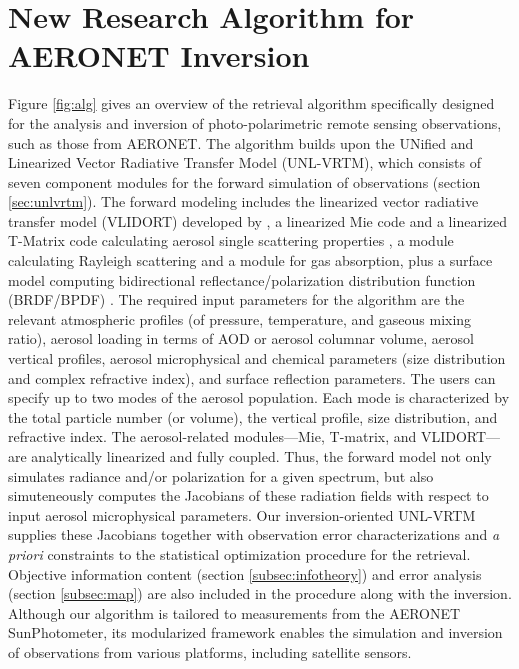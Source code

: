 \section{New Research Algorithm for AERONET Inversion}
\label{sec:algorithm}

Figure \ref{fig:alg} gives an overview of the retrieval algorithm specifically
designed for the analysis and inversion of photo-polarimetric remote
sensing observations, such as those from AERONET. The algorithm builds
upon the UNified and Linearized Vector Radiative Transfer Model
(UNL-VRTM), which consists of seven component modules for the forward
simulation of observations (section \ref{sec:unlvrtm}). The forward 
modeling includes the linearized vector
radiative transfer model (VLIDORT) developed by \citet{Spurr06}, a
linearized Mie code and a linearized T-Matrix code calculating aerosol
single scattering properties \citep{Spurr12}, a module calculating
Rayleigh scattering and a module for gas absorption, plus a surface
model computing bidirectional reflectance/polarization distribution
function (BRDF/BPDF) \citep{Spurr04}. The required input parameters for
the algorithm are the relevant atmospheric profiles (of pressure,
temperature, and gaseous mixing ratio), aerosol loading in terms of AOD
or aerosol columnar volume, aerosol vertical profiles, aerosol
microphysical and chemical parameters (size distribution and complex
refractive index), and surface reflection parameters. The users can
specify up to two modes of the aerosol population. Each mode is
characterized by the total particle number (or volume), the vertical
profile, size distribution, and refractive index. The aerosol-related
modules---Mie, T-matrix, and VLIDORT---are analytically linearized and fully
coupled. Thus, the forward model not only simulates radiance and/or
polarization for a given spectrum, but also simuteneously computes the Jacobians of
these radiation fields with respect to input aerosol microphysical
parameters. Our inversion-oriented UNL-VRTM supplies these Jacobians
together with observation error characterizations and \textit{a priori}
constraints to the statistical optimization procedure for the retrieval.
Objective information content (section \ref{subsec:infotheory}) and 
error analysis (section \ref{subsec:map}) are also included in the
procedure along with the inversion. Although our algorithm is tailored
to measurements from the AERONET SunPhotometer, its modularized
framework enables the simulation and inversion of observations from
various platforms, including satellite sensors. 

